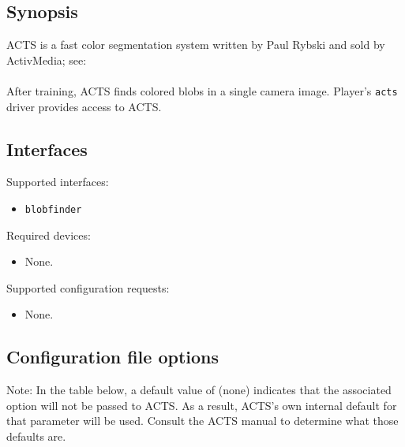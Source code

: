 \subsection*{Synopsis}
ACTS is a fast color segmentation system written by Paul Rybski and sold
by ActivMedia; see:\\
\\
After training, ACTS finds colored blobs in a single camera image.
Player's {\tt acts} driver provides access to ACTS.


\subsection*{Interfaces}

\noindent Supported interfaces:
\begin{itemize}
\item {\tt blobfinder}
\end{itemize}

\noindent Required devices:
\begin{itemize}
\item None.
\end{itemize}

\noindent Supported configuration requests:
\begin{itemize}
\item None.
\end{itemize}


\subsection*{Configuration file options}
Note: In the table below, a default value of (none) indicates that the
associated option will not be passed to ACTS.  As a result, ACTS's own
internal default for that parameter will be used.  Consult the ACTS manual
to determine what those defaults are.

